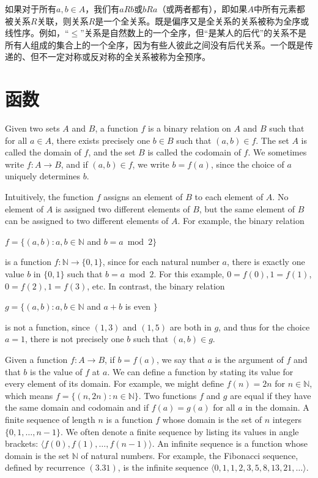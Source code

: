 \documentclass[lang=cn,newtx,10pt,scheme=chinese]{elegantbook}
\begin{document}
如果对于所有$a, b \in A$，我们有$a R b$或$b R a$（或两者都有），即如果$A$中所有元素都被关系$R$关联，则关系$R$是一个全关系。既是偏序又是全关系的关系被称为全序或线性序。例如，“$\leq$”关系是自然数上的一个全序，但“是某人的后代”的关系不是所有人组成的集合上的一个全序，因为有些人彼此之间没有后代关系。一个既是传递的、但不一定对称或反对称的全关系被称为全预序。

\section{函数}

Given two sets $A$ and $B$, a function $f$ is a binary relation on $A$ and $B$ such that for all $a \in A$, there exists precisely one $b \in B$ such that $(a, b) \in f$. The set $A$ is called the domain of $f$, and the set $B$ is called the codomain of $f$. We sometimes write $f: A \rightarrow B$, and if $(a, b) \in f$, we write $b=f(a)$, since the choice of $a$ uniquely determines $b$.

Intuitively, the function $f$ assigns an element of $B$ to each element of $A$. No element of $A$ is assigned two different elements of $B$, but the same element of $B$ can be assigned to two different elements of $A$. For example, the binary relation

$f=\{(a, b): a, b \in \mathbb{N}$ and $b=a \bmod 2\}$

is a function $f: \mathbb{N} \rightarrow\{0,1\}$, since for each natural number $a$, there is exactly one value $b$ in $\{0,1\}$ such that $b=a \bmod 2$. For this example, $0=f(0), 1=f(1)$, $0=f(2), 1=f(3)$, etc. In contrast, the binary relation

$g=\{(a, b): a, b \in \mathbb{N}$ and $a+b$ is even $\}$

is not a function, since $(1,3)$ and $(1,5)$ are both in $g$, and thus for the choice $a=1$, there is not precisely one $b$ such that $(a, b) \in g$.

Given a function $f: A \rightarrow B$, if $b=f(a)$, we say that $a$ is the argument of $f$ and that $b$ is the value of $f$ at $a$. We can define a function by stating its value for every element of its domain. For example, we might define $f(n)=2 n$ for $n \in \mathbb{N}$, which means $f=\{(n, 2 n): n \in \mathbb{N}\}$. Two functions $f$ and $g$ are equal if they have the same domain and codomain and if $f(a)=g(a)$ for all $a$ in the domain.
A finite sequence of length $n$ is a function $f$ whose domain is the set of $n$ integers $\{0,1, \ldots, n-1\}$. We often denote a finite sequence by listing its values in angle brackets: $\langle f(0), f(1), \ldots, f(n-1)\rangle$. An infinite sequence is a function whose domain is the set $\mathbb{N}$ of natural numbers. For example, the Fibonacci sequence, defined by recurrence $(3.31)$, is the infinite sequence $\langle 0,1,1,2,3,5,8,13,21, \ldots\rangle$.
\end{document}
